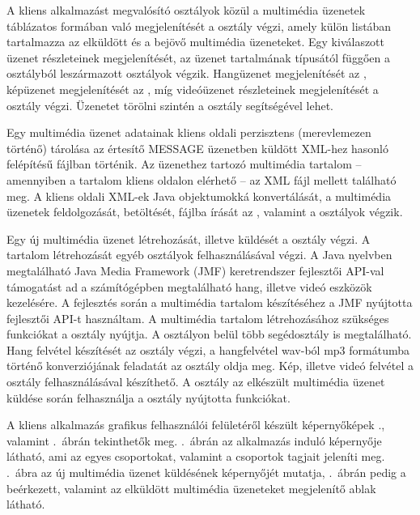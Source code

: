 \medskip

A kliens alkalmazást megvalósító osztályok közül a multimédia üzenetek táblázatos formában való megjelenítését a  osztály végzi, amely külön listában tartalmazza az elküldött és a bejövő multimédia üzeneteket. Egy kiválaszott üzenet részleteinek megjelenítését, az üzenet tartalmának típusától függően a  osztályból leszármazott osztályok végzik. Hangüzenet megjelenítését az , képüzenet megjelenítését az , míg videóüzenet részleteinek megjelenítését a  osztály végzi. Üzenetet törölni szintén a  osztály segítségével lehet. 

\medskip

Egy multimédia üzenet adatainak kliens oldali perzisztens (merevlemezen történő) tárolása az értesítő MESSAGE üzenetben küldött XML-hez hasonló felépítésű fájlban történik. Az üzenethez tartozó multimédia tartalom -- amennyiben a tartalom kliens oldalon elérhető -- az XML fájl mellett található meg. A kliens oldali XML-ek Java objektumokká konvertálását, a multimédia üzenetek feldolgozását, betöltését, fájlba írását az , valamint a  osztályok végzik.

\medskip

Egy új multimédia üzenet létrehozását, illetve küldését a  osztály végzi. A tartalom létrehozását egyéb osztályok felhasználásával végzi. A Java nyelvben megtalálható Java Media Framework (JMF) keretrendszer \cite{jmf} fejlesztői API-val támogatást ad a számítógépben megtalálható hang, illetve videó eszközök kezelésére. A fejlesztés során a multimédia tartalom készítéséhez a JMF nyújtotta fejlesztői API-t használtam. A multimédia tartalom létrehozásához szükséges funkciókat a  osztály nyújtja. A  osztályon belül több segédosztály is megtalálható. Hang felvétel készítését az  osztály végzi, a hangfelvétel wav-ból mp3 formátumba történő konverziójának feladatát az  osztály oldja meg. Kép, illetve videó felvétel a  osztály felhasználásával készíthető. A  osztály az elkészült multimédia üzenet küldése során felhasználja a  osztály nyújtotta funkciókat.

\medskip

A kliens alkalmazás grafikus felhasználói felületéről készült képernyőképek ., valamint .~ábrán tekinthetők meg. .~ábrán az alkalmazás induló képernyője látható, ami az egyes csoportokat, valamint a csoportok tagjait jeleníti meg. .~ábra az új multimédia üzenet küldésének képernyőjét mutatja, .~ábrán pedig a beérkezett, valamint az elküldött multimédia üzeneteket megjelenítő ablak látható.

